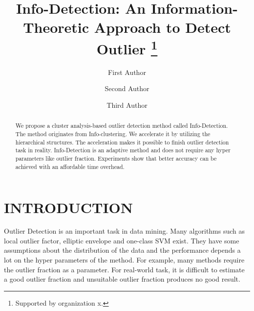 \documentclass[runningheads]{llncs}
\begin{document}
%
\title{Info-Detection: An Information-Theoretic Approach to Detect Outlier \thanks{Supported by organization x.}}
%
%
\author{First Author \and
Second Author \and
Third Author}
%
%
%
\maketitle              %
%
\begin{abstract}
We propose a cluster analysis-based outlier detection method called Info-Detection. The method originates from Info-clustering. We accelerate it by utilizing the hierarchical structures. The acceleration makes it possible to finish outlier detection task in reality. Info-Detection is an adaptive method and does not require any hyper parameters like outlier fraction. Experiments show that better accuracy can be achieved with an affordable time overhead.

\end{abstract}
%
%
%
\section{INTRODUCTION}
Outlier Detection is an important task in data mining. Many algorithms such as local outlier factor, elliptic envelope and one-class SVM exist. They have some assumptions about the distribution of the data and the performance depends a lot on the hyper parameters of the method. For example, many methods require the outlier fraction as a parameter. For real-world task, it is difficult to estimate a good outlier fraction and unsuitable outlier fraction produces no good result. 
\end{document}
